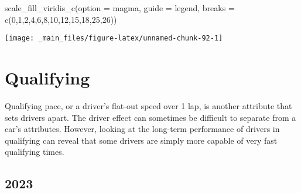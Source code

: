 \documentclass[
]{book}
\newenvironment{Shaded}{\begin{snugshade}}{\end{snugshade}}
\newcommand{\AttributeTok}[1]{\textcolor[rgb]{0.77,0.63,0.00}{#1}}
\newcommand{\DecValTok}[1]{\textcolor[rgb]{0.00,0.00,0.81}{#1}}
\newcommand{\FunctionTok}[1]{\textcolor[rgb]{0.00,0.00,0.00}{#1}}
\newcommand{\NormalTok}[1]{#1}
\newcommand{\StringTok}[1]{\textcolor[rgb]{0.31,0.60,0.02}{#1}}
\begin{document}
\begin{Shaded}
\begin{Highlighting}[]
  \FunctionTok{scale\_fill\_viridis\_c}\NormalTok{(}\AttributeTok{option =} \StringTok{\textquotesingle{}magma\textquotesingle{}}\NormalTok{,}
                       \AttributeTok{guide =} \StringTok{\textquotesingle{}legend\textquotesingle{}}\NormalTok{,}
                       \AttributeTok{breaks =} \FunctionTok{c}\NormalTok{(}\DecValTok{0}\NormalTok{,}\DecValTok{1}\NormalTok{,}\DecValTok{2}\NormalTok{,}\DecValTok{4}\NormalTok{,}\DecValTok{6}\NormalTok{,}\DecValTok{8}\NormalTok{,}\DecValTok{10}\NormalTok{,}\DecValTok{12}\NormalTok{,}\DecValTok{15}\NormalTok{,}\DecValTok{18}\NormalTok{,}\DecValTok{25}\NormalTok{,}\DecValTok{26}\NormalTok{))}
\end{Highlighting}
\end{Shaded}

\begin{center}\texttt{[image: \_main\_files/figure-latex/unnamed-chunk-92-1]} \end{center}

\hypertarget{qualifying-1}{%
\section{Qualifying}\label{qualifying-1}}

Qualifying pace, or a driver's flat-out speed over 1 lap, is another attribute that sets drivers apart. The driver effect can sometimes be difficult to separate from a car's attributes. However, looking at the long-term performance of drivers in qualifying can reveal that some drivers are simply more capable of very fast qualifying times.

\hypertarget{section}{%
\subsection{2023}\label{section}}
\end{document}
